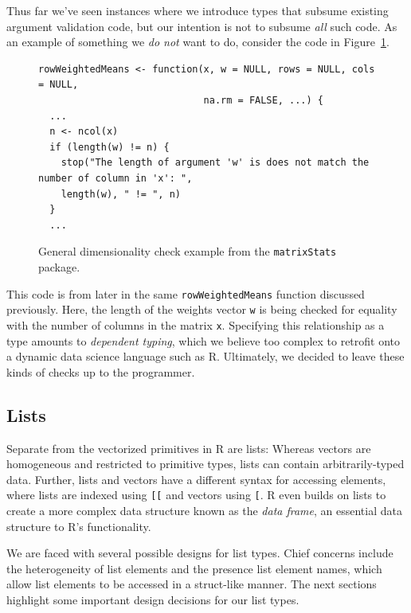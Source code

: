 \documentclass[acmsmall,review,anonymous]{acmart}\settopmatter{printfolios=true,printccs=false,printacmref=false}
\newcommand{\code}[1]{{\lstinline[style=Rin]!#1!}\xspace}
\begin{document}
Thus far we've seen instances where we introduce types that subsume existing argument validation code, but our intention is not to subsume {\it all} such code.
As an example of something we {\it do not} want to do, consider the code in Figure~\ref{fig:general-validation-example}.

\begin{figure}[htbp]
\begin{center}

\begin{lstlisting}
rowWeightedMeans <- function(x, w = NULL, rows = NULL, cols = NULL,
                             na.rm = FALSE, ...) {
  ...
  n <- ncol(x)
  if (length(w) != n) {
    stop("The length of argument 'w' is does not match the number of column in 'x': ", 
    length(w), " != ", n)
  }
  ...
\end{lstlisting}

\caption{General dimensionality check example from the \code{matrixStats} package.}
\label{fig:general-validation-example}
\end{center}
\end{figure}

This code is from later in the same \code{rowWeightedMeans} function discussed previously.
Here, the length of the weights vector \code{w} is being checked for equality with the number of columns in the matrix \code{x}. 
Specifying this relationship as a type amounts to {\it dependent typing}, which we believe too complex to retrofit onto a dynamic data science language such as R.  
Ultimately, we decided to leave these kinds of checks up to the programmer.

%
%
%
%
\subsection{Lists}

Separate from the vectorized primitives in R are lists:
Whereas vectors are homogeneous and restricted to primitive types, lists can contain arbitrarily-typed data.  
Further, lists and vectors have a different syntax for accessing elements, where lists are indexed using \code{[[} and vectors using \code{[}.
R even builds on lists to create a more complex data structure known as the {\it data frame}, an essential data structure to R's functionality.

We are faced with several possible designs for list types.  
Chief concerns include the heterogeneity of list elements and the presence list element names, which allow list elements to be accessed in a struct-like manner.  
The next sections highlight some important design decisions for our list types.
\end{document}
